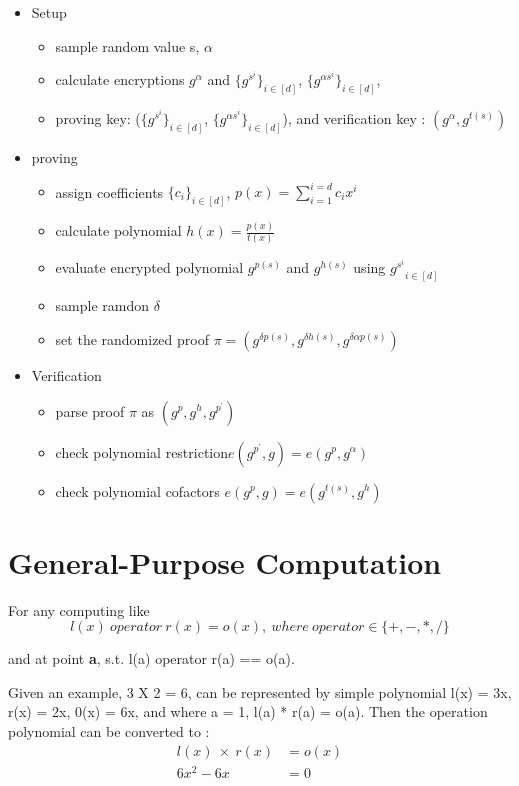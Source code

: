 \documentclass[a4paper,11pt]{article}
\begin{document}
\begin{itemize}
\item Setup
\begin{itemize}
\item sample random value s, $\alpha$
\item calculate encryptions $g^{\alpha}$ and $\{g^{s^i}\}_{i \in [d]}$, $\{g^{\alpha s^i}\}_{i \in [d]}$, 
\item proving key:  ($\{g^{s^i}\}_{i \in [d]}$, $\{g^{\alpha s^i}\}_{i \in [d]}$), and verification key : $(g^{\alpha}, g^{t(s)})$
\end{itemize}
\item proving
\begin{itemize}
\item assign coefficients $\{c_i\}_{i \in [d]}$, $p(x) = \sum_{i=1}^{i=d}{c_i x^i}$
\item calculate polynomial $h(x) = \frac{p(x)}{t(x)}$
\item evaluate encrypted polynomial $g^{p(s)}$ and $g^{h(s)}$ using ${g^{s^i}}_{i \in [d]}$ 
\item sample ramdon $\delta$
\item set the randomized proof $\pi = (g^{\delta p(s)}, g^{\delta h(s)}, g^{\delta \alpha p(s)})$
\end{itemize}
\item Verification
\begin{itemize}
\item parse proof $\pi$ as $(g^p, g^h, g^{p^{'}})$
\item check polynomial restriction$ e(g^{p^{'}}, g) = e(g^p, g^{\alpha})$
\item check polynomial cofactors $e(g^p, g) = e(g^{t(s)}, g^h)$
\end{itemize}
\end{itemize}


\section{General-Purpose Computation}

For any computing like   
\begin{equation}
l(x)\ operator\ r(x) = o(x) ,\  where\ operator \in \{+, -, *, /\}
\end{equation}

and at point \textbf{a}, s.t. l(a) operator r(a) == o(a).

Given an example,  3 X 2 = 6,  can be represented by simple polynomial l(x) = 3x, r(x) = 2x,  0(x) = 6x,  and where a = 1, l(a) * r(a) = o(a).
Then the operation polynomial can be converted to :
\begin{equation}
\begin{split}
l(x)\ \times\ r(x) &= o(x)  \\
 6x^2 - 6x &= 0 \\
 \end{split}
\end{equation}
\end{document}
